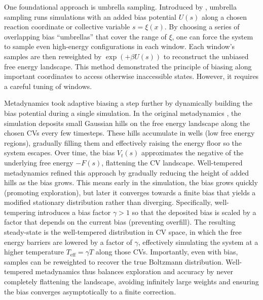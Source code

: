 \documentclass[]{fairmeta}
\theoremstyle{remark}
\begin{document}
One foundational approach is umbrella sampling. Introduced by \citet{torrie1977nonphysical}, umbrella sampling runs simulations with an added bias potential $U(s)$ along a chosen reaction coordinate or collective variable $s = \xi(x)$. By choosing a series of overlapping bias ``umbrellas'' that cover the range of $\xi$, one can force the system to sample even high-energy configurations in each window. Each window's samples are then reweighted by $\exp(+\beta U(s))$ to reconstruct the unbiased free energy landscape. This method demonstrated the principle of biasing along important coordinates to access otherwise inaccessible states. However, it requires a careful tuning of windows.

Metadynamics took adaptive biasing a step further by dynamically building the bias potential during a single simulation. In the original metadynamics \citep{laio2002escaping}, the simulation deposits small Gaussian hills on the free energy landscape along the chosen CVs every few timesteps. These hills accumulate in wells (low free energy regions), gradually filling them and effectively raising the energy floor so the system escapes. Over time, the bias $V_t(s)$ approximates the negative of the underlying free energy $-F(s)$, flattening the CV landscape. Well-tempered metadynamics \citep{barducci2008well} refined this approach by gradually reducing the height of added hills as the bias grows. This means early in the simulation, the bias grows quickly (promoting exploration), but later it converges towards a finite bias that yields a modified stationary distribution rather than diverging. Specifically, well-tempering introduces a bias factor $\gamma>1$ so that the deposited bias is scaled by a factor that depends on the current bias (preventing overfill). The resulting steady-state is the well-tempered distribution in CV space, in which the free energy barriers are lowered by a factor of $\gamma$, effectively simulating the system at a higher temperature $T_\text{eff} = \gamma T$ along those CVs. Importantly, even with bias, samples can be reweighted to recover the true Boltzmann distribution. Well-tempered metadynamics thus balances exploration and accuracy by never completely flattening the landscape, avoiding infinitely large weights and ensuring the bias converges asymptotically to a finite correction.
\end{document}
